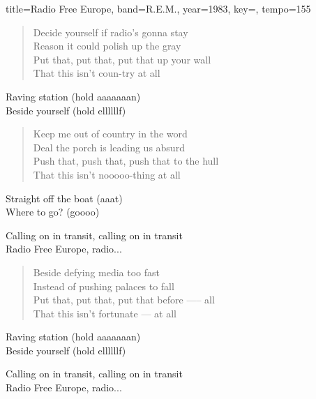 \documentclass{skrul-leadsheet}
\begin{document}
\begin{song}[transpose-capo=true]{title={Radio Free Europe}, band={R.E.M.}, year={1983}, key={}, tempo={155}}

\begin{verse}
Decide yourself if radio's gonna stay \\
Reason it could polish up the gray \\
Put that, put that, put that up your wall \\
That this isn't coun-try at all
\end{verse}

\begin{prechorus}
Raving station (hold aaaaaaan) \\
Beside yourself (hold ellllllf)
\end{prechorus}

\begin{verse}
Keep me out of country in the word \\
Deal the porch is leading us absurd \\
Push that, push that, push that to the hull \\
That this isn't nooooo-thing at all
\end{verse}

\begin{prechorus}
Straight off the boat (aaat) \\
Where to go? (goooo)
\end{prechorus}

\begin{chorus}
Calling on in transit, calling on in transit \\
Radio Free Europe, radio...
\end{chorus}

\begin{verse}
Beside defying media too fast \\
Instead of pushing palaces to fall \\
Put that, put that, put that before ----- all \\
That this isn't fortunate --- at all
\end{verse}

\begin{prechorus}
Raving station (hold aaaaaaan) \\
Beside yourself (hold ellllllf)
\end{prechorus}

\begin{chorus}
Calling on in transit, calling on in transit \\
Radio Free Europe, radio...
\end{chorus}


\end{song}
\end{document}
